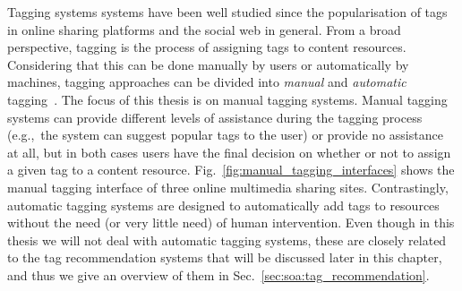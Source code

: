 Tagging systems systems have been well studied since the popularisation of tags in online sharing platforms and the social web in general.
From a broad perspective, tagging is the process of assigning tags to content resources.
Considering that this can be done manually by users or automatically by machines, tagging approaches can be divided into \emph{manual} and \emph{automatic} tagging~\citep{Wang2012}.
The focus of this thesis is on manual tagging systems.
Manual tagging systems can provide different levels of assistance during the tagging process (e.g.,~the system can suggest popular tags to the user) or provide no assistance at all, but in both cases users have the final decision on whether or not to assign a given tag to a content resource. Fig.~\ref{fig:manual_tagging_interfaces} shows the manual tagging interface of three online multimedia sharing sites.
Contrastingly, automatic tagging systems are designed to automatically add tags to resources without the need (or very little need) of human intervention. 
Even though in this thesis we will not deal with automatic tagging systems, these are closely related to the tag recommendation systems that will be discussed later in this chapter, and thus we give an overview of them in Sec.~\ref{sec:soa:tag_recommendation}.


